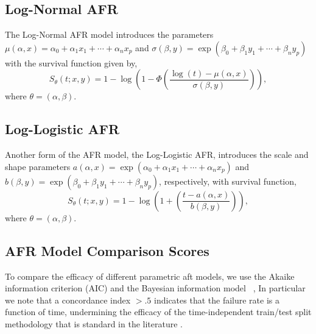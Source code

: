\subsection{Log-Normal AFR}

The Log-Normal AFR model introduces the parameters $\mu(\alpha, x) = \alpha_0 + \alpha_1 x_1 + \cdots + \alpha_n x_p $ and $\sigma(\beta, y) = \exp(\beta_0 + \beta_1 y_1 + \cdots + \beta_n y_p)$ with the survival function given by,
\[
	S_\theta(t; x, y) = 1 - \log \left( 1 - \Phi \left (  \frac{\log(t) - \mu(\alpha, x) }{ \sigma(\beta, y) } \right) \right),
\]
where $\theta = (\alpha, \beta)$.



\subsection{Log-Logistic AFR}

Another form of the AFR model, the Log-Logistic AFR, introduces the scale and shape parameters $a(\alpha, x) = \exp(\alpha_0 + \alpha_1 x_1 + \cdots + \alpha_n x_p )$ and $b(\beta, y) = \exp(\beta_0 + \beta_1 y_1 + \cdots + \beta_n y_p)$, respectively, with survival function,
\[
	S_\theta(t; x, y) = 1 - \log \left( 1 + \left (  \frac{t - a(\alpha, x) }{ b(\beta, y) }\right)\right),
\]
where $\theta = (\alpha, \beta)$.



\subsection{AFR Model Comparison Scores}
\label{metrics}

To compare the efficacy of different parametric aft models, we use the Akaike information criterion (AIC) and the Bayesian information model ~\citep{stoica2004model,taddy2019business},  In particular we note that a concordance index $> .5$ indicates that the failure rate is a function of time, undermining the efficacy of the time-independent train/test split methodology that is standard in the literature \cite{concordance}.





